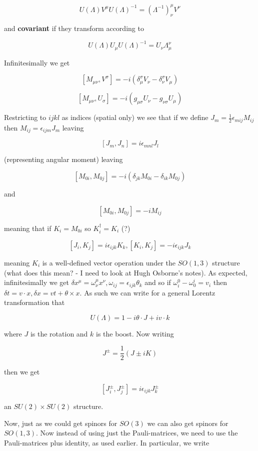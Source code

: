 \documentclass{article}
\theoremstyle{definition}
\begin{document}
$$ U(\Lambda) V^\mu U(\Lambda)^{-1} = (\Lambda^{-1})^\mu_\nu V^\nu $$

and \textbf{covariant} if they transform according to

$$ U(\Lambda) U_\mu U(\Lambda)^{-1} = U_\nu \Lambda^\nu_\mu $$

Infinitesimally we get

$$ [M_{\mu \nu}, V^\sigma] = -i (\delta^\sigma_\mu V_\nu - \delta^\sigma_\nu
V_\mu) $$

$$ [M_{\mu \nu}, U_\sigma] = -i (g_{\mu \sigma} U_\nu - g_{\nu \sigma} U_\mu) $$

Restricting to $ijkl$ as indices (spatial only) we see that if we define $J_m =
\frac{1}{2} \epsilon_{mij} M_{ij}$ then $M_{ij} = \epsilon_{ijm} J_m$ leaving

$$ [J_m, J_n] = i \epsilon_{mnl} J_l $$

(representing angular moment) leaving

$$ [M_{0i}, M_{0j}] = -i (\delta_{jk} M_{0i} - \delta_{ik} M_{0j}) $$

and

$$ [M_{0i}, M_{0j}] = -i M_{ij} $$

meaning that if $K_i = M_{0i}$ so $K_i^\dagger = K_i$ (?)

$$ [J_i, K_j] = i \epsilon_{ijk} K_k, [K_i, K_j] = -i \epsilon_{ijk} J_k $$

meaning $K_i$ is a well-defined vector operation under the $SO(1, 3)$ structure
(what does this mean? - I need to look at Hugh Osborne's notes). As expected,
infinitesimally we get $\delta x^\mu = \omega^\mu_\nu x^\nu, \omega_{ij} =
\epsilon_{ijk} \theta_k$ and so if $\omega^0_i - \omega^i_0 = v_i$ then $\delta
t = v \cdot x, \delta x = v t + \theta \times x$. As such we can write for a
general Lorentz transformation that

$$ U(\Lambda) = 1 - i \theta \cdot J + i v \cdot k $$

where $J$ is the rotation and $k$ is the boost. Now writing

$$ J^\pm = \frac{1}{2} (J \pm iK) $$

then we get

$$ [J_i^\pm, J_j^\pm] = i \epsilon_{ijk} J_k^\pm $$

an $SU(2) \times SU(2)$ structure. 

Now, just as we could get spinors for $SO(3)$ we can also get spinors for $SO(1,
3)$. Now instead of using just the Pauli-matrices, we need to use the
Pauli-matrices plus identity, as used earlier. In particular, we write
\end{document}
